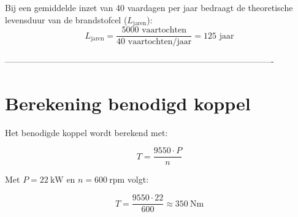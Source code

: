 Bij een gemiddelde inzet van 40 vaardagen per jaar bedraagt de theoretische levensduur van de brandstofcel ($L_{\text{jaren}}$):
\begin{equation}
L_{\text{jaren}} = \frac{5000 \text{ vaartochten}}{40 \text{ vaartochten/jaar}} = 125 \text{ jaar}
\end{equation}


----------------------------------------------------------------------------------------------

\appendix
\section{Berekening benodigd koppel}
\label{app:koppelberekening}

Het benodigde koppel wordt berekend met:

\begin{equation}
T = \frac{9550 \cdot P}{n}
\label{eq:koppelberekening}
\end{equation}

Met $P = 22~\text{kW}$ en $n = 600~\text{rpm}$ volgt:

\begin{equation}
T = \frac{9550 \cdot 22}{600} \approx 350~\text{Nm}
\end{equation}